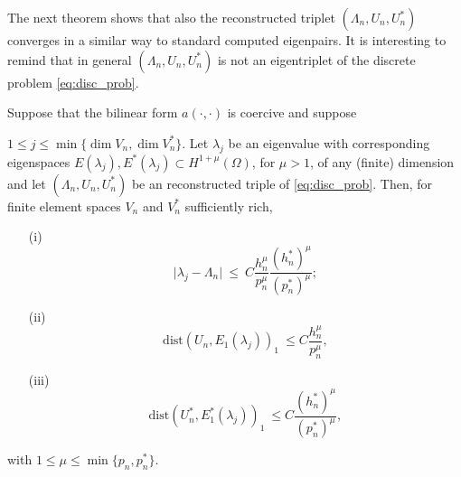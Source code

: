 \documentclass[smallextended]{svjour3}
\begin{document}
The next theorem shows that also the reconstructed triplet $(\Lambda_n,U_n,U_n^*)$ converges in a similar way to standard computed eigenpairs. It is interesting to remind that in general $(\Lambda_n,U_n,U_n^*)$ is not an eigentriplet of the discrete problem \eqref{eq:disc_prob}.


\begin{theorem}
\label{th:adj_rec}
Suppose  that the bilinear form $a(\cdot,\cdot)$ is coercive and suppose

$ 1 \leq j\leq \min\{\dim V_n,\dim V_n^*\}$. 
Let
$\lambda_j$ be an eigenvalue with
corresponding eigenspaces $E(\lambda_j),E^*(\lambda_j)\subset H^{1+\mu}(\Omega)$, for $\mu>1$, of any (finite) dimension  and
let $(\Lambda_n,U_n,U_n^*)$ be an  reconstructed triple  of \eqref{eq:disc_prob}.
Then, for finite element spaces $V_n$ and $V_n^*$ sufficiently rich,


\begin{itemize}
\item[(i)] 
\begin{equation}\label{eq:supereig_rec}
\vert \lambda_j - \Lambda_n \vert \ \leq \ C
\frac{h_n^{\mu} }{p_n^{\mu}}\frac{(h_n^*)^{\mu} }{(p_n^*)^{\mu}};  
\end{equation}
\item[(ii)] 
\begin{equation}
\label{eq:energy_rec} \mathrm{dist}(
U_n,E_1(\lambda_j))_{1} \ \leq
C \frac{h_n^{\mu}}{p_n^{\mu}}, 
\end{equation}
\item[(iii)]
\begin{equation}
\label{eq:energy_dual_rec} \mathrm{dist}(
U_n^*,E_1^*(\lambda_j))_{1} \ \leq
C \frac{(h_n^*)^{\mu}}{(p_n^*)^{\mu}}, 
\end{equation}
\end{itemize}
with $1\leq \mu\leq \min\{p_n,p_n^*\}$.
\end{theorem}
\end{document}
